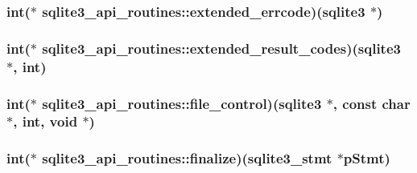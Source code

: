 \hypertarget{structsqlite3__api__routines_abc8b842c381e74bd6880f49df71ec395}{
\subsubsection[{extended\-\_\-errcode}]{\setlength{\rightskip}{0pt plus 5cm}int($\ast$ sqlite3\-\_\-api\-\_\-routines\-::extended\-\_\-errcode)({\bf sqlite3} $\ast$)}}\label{structsqlite3__api__routines_abc8b842c381e74bd6880f49df71ec395}
\hypertarget{structsqlite3__api__routines_ab1f8f2e2de939f53365bf6b6f439e379}{
\subsubsection[{extended\-\_\-result\-\_\-codes}]{\setlength{\rightskip}{0pt plus 5cm}int($\ast$ sqlite3\-\_\-api\-\_\-routines\-::extended\-\_\-result\-\_\-codes)({\bf sqlite3} $\ast$, int)}}\label{structsqlite3__api__routines_ab1f8f2e2de939f53365bf6b6f439e379}
\hypertarget{structsqlite3__api__routines_afe67e4e8a6dd2e44cc24e99e0555b807}{
\subsubsection[{file\-\_\-control}]{\setlength{\rightskip}{0pt plus 5cm}int($\ast$ sqlite3\-\_\-api\-\_\-routines\-::file\-\_\-control)({\bf sqlite3} $\ast$, const char $\ast$, int, void $\ast$)}}\label{structsqlite3__api__routines_afe67e4e8a6dd2e44cc24e99e0555b807}
\hypertarget{structsqlite3__api__routines_ad7cee4127bfd0583ccfea40943858de2}{
\subsubsection[{finalize}]{\setlength{\rightskip}{0pt plus 5cm}int($\ast$ sqlite3\-\_\-api\-\_\-routines\-::finalize)({\bf sqlite3\-\_\-stmt} $\ast$p\-Stmt)}}\label{structsqlite3__api__routines_ad7cee4127bfd0583ccfea40943858de2}
